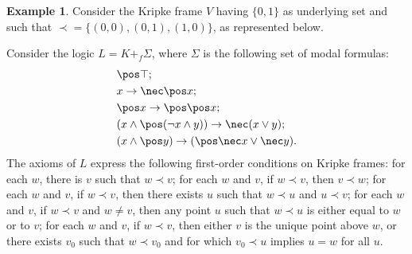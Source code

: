 \documentclass{article}
\theoremstyle{definition}
\newtheorem{example}{Example}
\begin{document}
\begin{example}\label{ex:beth}
Consider the Kripke frame $V$ having $\{0,1\}$ as underlying set and such that $\prec = \{(0,0), (0,1), (1,0)\}$, as represented below.
\begin{center}
\end{center}
Consider the logic $L = K +_f \Sigma$, where $\Sigma$ is the following set of modal formulas:
\begin{align*}
    &\pos \top; \\ %
    &x \to \nec \pos x; \\
    &\pos x \to \pos \pos x; \\
    &(x \wedge \pos (\neg x \wedge y)) \to \nec (x \vee y); \\
    &(x \wedge \pos y) \to (\pos \nec x \vee \nec y).
\end{align*}
The axioms of $L$ express the following first-order conditions on Kripke frames: for each $w$, there is $v$ such that $w \prec v$; for each $w$ and $v$, if $w \prec v$, then $v \prec w$; for each $w$ and $v$, if $w \prec v$, then there exists $u$ such that $w \prec u$ and $u \prec v$; for each $w$ and $v$, if $w \prec v$ and $w \neq v$, then any point $u$ such that $w \prec u$ is either equal to $w$ or to $v$; for each $w$ and $v$, if $w \prec v$, then either $v$ is the unique point above $w$, or there exists $v_0$ such that $w \prec v_0$ and for which $v_0 \prec u$ implies $u = w$ for all $u$.

\end{example}
\end{document}
